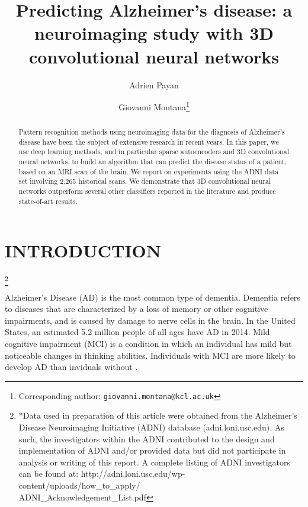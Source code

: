\documentclass[a4paper,10pt]{article}
\begin{document}
\title{Predicting Alzheimer's disease: a neuroimaging study with 3D convolutional neural networks}  

\author[1]{Adrien Payan} 
\author[1,2]{Giovanni Montana\footnote{Corresponding author: \tt{giovanni.montana@kcl.ac.uk}}}


\maketitle

\begin{abstract}

Pattern recognition methods using neuroimaging data for the diagnosis of Alzheimer's disease have been the subject of extensive research in recent years. In this paper, we use deep learning methods, and in particular sparse autoencoders and 3D convolutional neural networks, to build an algorithm that can predict the disease status of a patient, based on an MRI scan of the brain. We report on experiments using the ADNI data set involving 2,265 historical scans. We demonstrate that 3D convolutional neural networks outperform several other classifiers reported in the literature and produce state-of-art results.

\end{abstract}

\section{\uppercase{Introduction}}\label{sec:introduction}

\let\thefootnote\relax\footnote{*Data used in preparation of this article were obtained from the Alzheimer's Disease Neuroimaging Initiative (ADNI) database (adni.loni.usc.edu). As such, the investigators within the ADNI contributed to the design and implementation of ADNI and/or provided data but did not participate in analysis or writing of this report. A complete listing of ADNI investigators can be found at: http://adni.loni.usc.edu/wp-content/uploads/how\_to\_apply/\\ADNI\_Acknowledgement\_List.pdf}

\noindent Alzheimer's Disease (AD) is the most common type of dementia. Dementia refers to diseases that are characterized by a loss of memory or other cognitive impairments, and is caused by damage to nerve cells in the brain. In the United States, an estimated 5.2 million people of all ages have AD in 2014. Mild cognitive impairment (MCI) is a condition in which an individual has mild but noticeable changes in thinking abilities. Individuals with MCI are more likely to develop AD than inviduals without \cite{AD}.
\end{document}
